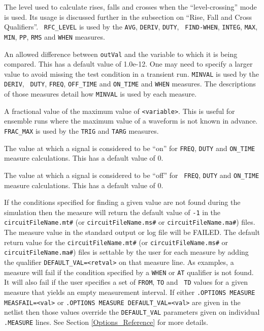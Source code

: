 \begin{Command}
\begin{Arguments}
The level used to calculate rises, falls and crosses when the
``level-crossing'' mode is used.  Its usage is discussed further in
the subsection on ``Rise, Fall and Cross Qualifiers''.  {\tt
RFC\_LEVEL} is used by the {\tt AVG}, {\tt DERIV}, {\tt DUTY}, {\tt
FIND-WHEN}, {\tt INTEG}, {\tt MAX}, {\tt MIN}, {\tt PP}, {\tt RMS} and
{\tt WHEN} measures.


An allowed difference between \texttt{outVal} and the variable to
which it is being compared.  This has a default value of 1.0e-12.  One
may need to specify a larger value to avoid missing the test condition
in a transient run.  {\tt MINVAL} is used by the {\tt DERIV}, {\tt
DUTY}, {\tt FREQ}, {\tt OFF\_TIME} and {\tt ON\_TIME} and {\tt WHEN}
measures.  The descriptions of those measures detail how {\tt MINVAL}
is used by each measure.


A fractional value of the maximum value of \texttt{<variable>}.  This
is useful for ensemble runs where the maximum value of a waveform is
not known in advance.  {\tt FRAC\_MAX} is used by the {\tt TRIG} and
{\tt TARG} measures.


The value at which a signal is considered to be ``on'' for {\tt FREQ},
{\tt DUTY} and {\tt ON\_TIME} measure calculations.  This has a
default value of 0.


The value at which a signal is considered to be ``off'' for {\tt
FREQ}, {\tt DUTY} and {\tt ON\_TIME} measure calculations.  This has a
default value of 0.


If the conditions specified for finding a given value are not found
during the simulation then the measure will return the default value
of {\tt -1} in the \texttt{circuitFileName.mt\#}
(or \texttt{circuitFileName.ms\#} or \texttt{circuitFileName.ma\#})
files.  The measure value in the standard output or log file will be
FAILED.  The default return value for
the \texttt{circuitFileName.mt\#} (or \texttt{circuitFileName.ms\#}
or \texttt{circuitFileName.ma\#}) files is settable by the user for
each measure by adding the qualifier {\tt DEFAULT\_VAL=<retval>} on
that measure line.  As examples, a measure will fail if the condition
specified by a {\tt WHEN} or {\tt AT} qualifier is not found.  It will
also fail if the user specifies a set of {\tt FROM}, {\tt TO} and {\tt
TD} values for a given measure that yields an empty measurement
interval.  If either \texttt{.OPTIONS MEASURE MEASFAIL=<val>}
or \texttt{.OPTIONS MEASURE DEFAULT\_VAL=<val>} are given in the
netlist then those values override the \texttt{DEFAULT\_VAL}
parameters given on individual
\texttt{.MEASURE} lines.  See Section \ref{Options_Reference} for more details.


\end{Arguments}
\end{Command}
